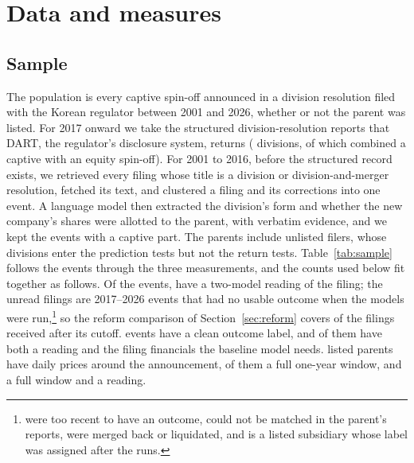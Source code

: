 \section{Data and measures}\label{sec:data}

\subsection{Sample}\label{sec:sample}

The population is every captive spin-off announced in a division resolution filed with the Korean regulator between 2001 and 2026, whether or not the parent was listed. For 2017 onward we take the structured division-resolution reports that DART, the regulator's disclosure system, returns (\NNewN{} divisions, \NMixed{} of which combined a captive with an equity spin-off). For 2001 to 2016, before the structured record exists, we retrieved every filing whose title is a division or division-and-merger resolution, fetched its text, and clustered a filing and its corrections into one event. A language model then extracted the division's form and whether the new company's shares were allotted to the parent, with verbatim evidence, and we kept the \NOldN{} events with a captive part. The parents include unlisted filers, whose divisions enter the prediction tests but not the return tests. Table~\ref{tab:sample} follows the events through the three measurements, and the counts used below fit together as follows. Of the \NAllN{} events, \NScored{} have a two-model reading of the filing; the \NUnread{} unread filings are 2017--2026 events that had no usable outcome when the models were run,\footnote{\NUnreadTooRecent{} were too recent to have an outcome, \NUnreadUnmatched{} could not be matched in the parent's reports, \NUnreadMergedLiq{} were merged back or liquidated, and \NUnreadClean{} is a listed subsidiary whose label was assigned after the runs.} so the reform comparison of Section~\ref{sec:reform} covers \NPostFilings{} of the \NPostAll{} filings received after its cutoff. \NClean{} events have a clean outcome label, and \NGateOne{} of them have both a reading and the filing financials the baseline model needs. \NAllPriced{} listed parents have daily prices around the announcement, \NAllPricedOneY{} of them a full one-year window, and \NScoreOneY{} a full window and a reading.

